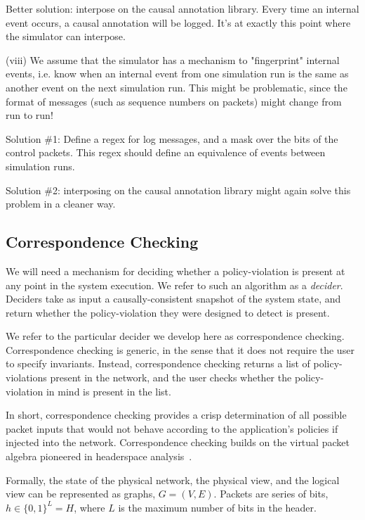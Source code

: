 Better solution: interpose on the causal annotation library. Every time an internal event occurs, a causal annotation will be logged. It's at exactly this point where the simulator can interpose.

(viii) We assume that the simulator has a mechanism to "fingerprint" internal events, i.e. know when an internal event from one simulation run is the same as another event on the next simulation run. This might be problematic, since the format of messages (such as sequence numbers on packets) might change from run to run!

Solution \#1: Define a regex for log messages, and a mask over the bits of the control packets. This regex should define an equivalence of events between simulation runs. 

Solution \#2: interposing on the causal annotation library might again solve this problem in a cleaner way.

\subsection{Correspondence Checking}

We will need a mechanism for deciding
whether a policy-violation is present at any point in the system execution.
We refer to such an algorithm as a {\em decider}. Deciders take as input a
causally-consistent snapshot of the system state, and return whether the
policy-violation they were designed to detect is present.

We refer to the particular decider we develop here as correspondence checking.
Correspondence checking is generic, in the sense that it does not require
the user to specify invariants. Instead, correspondence checking returns a list
of policy-violations present in the network, and the user checks whether the
policy-violation in mind is present in the list.

In short, correspondence checking provides a crisp determination of all possible packet inputs that
would not behave according to the application's policies if injected into the
network. Correspondence checking builds on the virtual packet algebra pioneered in headerspace
analysis~\cite{hsa}. 

Formally, the state of the physical network, the physical view, and the
logical view can be represented as graphs,
$G = (V, E)$. Packets are series of bits, $h \in \{0,1\}^L = H$,
where $L$ is the maximum number of bits in the header.

